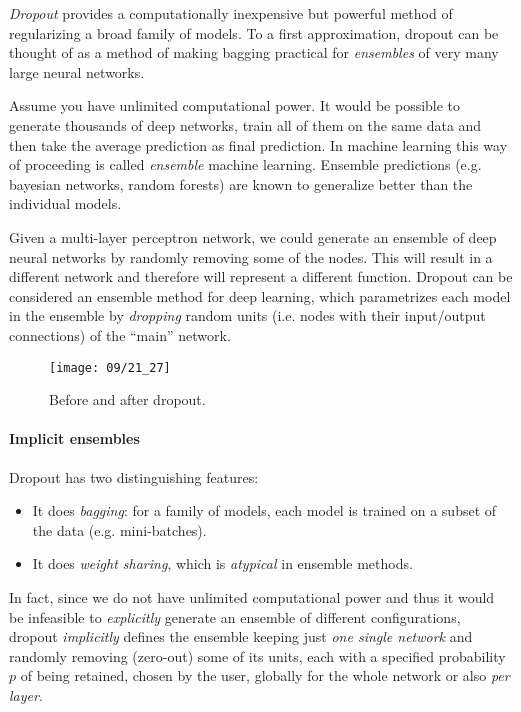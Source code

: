 
\emph{Dropout} provides a computationally inexpensive but
powerful method of regularizing a broad family of models. 
To a first approximation, dropout can be thought of as a method of making bagging practical for \emph{ensembles} of very many large neural networks.

Assume you have unlimited computational power. It would be possible to generate thousands  of deep networks, train all of them on the same data and then take the average prediction as final prediction. In machine learning this way of proceeding is called \emph{ensemble} machine learning. Ensemble predictions (e.g. bayesian networks, random forests) are known to generalize better than the individual models.

Given a multi-layer perceptron network, we could generate an ensemble of deep neural networks by randomly removing some of the nodes. This will result in a different network and therefore will represent a different function. 
Dropout can be considered an ensemble method for deep learning, which 
parametrizes each model in the ensemble by \emph{dropping} random units (i.e. nodes with their input/output connections) of the ``main'' network.
\begin{figure}[H]
    \centering
    \texttt{[image: 09/21\_27]}
    \caption{Before and after dropout.}	
\end{figure}

\paragraph{Implicit ensembles}
Dropout has two distinguishing features:
\begin{itemize}
    \item It does \emph{bagging}: for a family of models, each model is trained on a subset of the data (e.g. mini-batches).
    \item It does \emph{weight sharing}, which is \emph{atypical} in ensemble methods.
\end{itemize}

In fact, since we do not have unlimited computational power and thus it would be infeasible to \emph{explicitly} generate an ensemble of different configurations, dropout \emph{implicitly} defines the ensemble keeping just \emph{one single network} and randomly removing (zero-out) some of its units, each with a specified probability $p$ of being retained, chosen by the user, globally for the whole network or also \emph{per layer}.
\\

